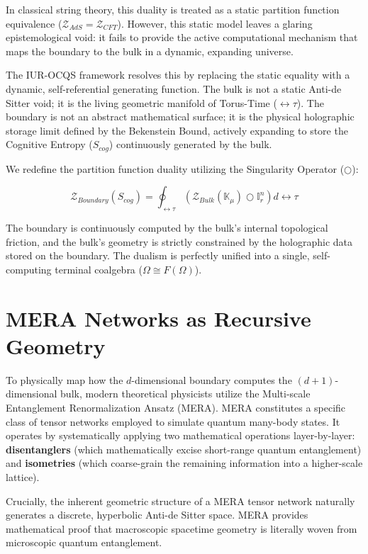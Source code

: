 \documentclass[12pt,openany]{book}
\begin{document}
In classical string theory, this duality is treated as a static partition function equivalence ($\mathcal{Z}_{AdS} = \mathcal{Z}_{CFT}$). However, this static model leaves a glaring epistemological void: it fails to provide the active computational mechanism that maps the boundary to the bulk in a dynamic, expanding universe. 

The IUR-OCQS framework resolves this by replacing the static equality with a dynamic, self-referential generating function. The bulk is not a static Anti-de Sitter void; it is the living geometric manifold of Torus-Time ($\leftrightarrow\tau$). The boundary is not an abstract mathematical surface; it is the physical holographic storage limit defined by the Bekenstein Bound, actively expanding to store the Cognitive Entropy ($S_{cog}$) continuously generated by the bulk. 

We redefine the partition function duality utilizing the Singularity Operator ($\bigcirc$):

\begin{equation}
\mathcal{Z}_{Boundary}(S_{cog}) = \oint_{\leftrightarrow\tau} \left( \mathcal{Z}_{Bulk}(\mathbb{K}_\mu) \bigcirc \mathbb{I}_r^n \right) d\leftrightarrow\tau
\end{equation}

The boundary is continuously computed by the bulk's internal topological friction, and the bulk's geometry is strictly constrained by the holographic data stored on the boundary. The dualism is perfectly unified into a single, self-computing terminal coalgebra ($\Omega \cong F(\Omega)$).

\section{MERA Networks as Recursive Geometry}
To physically map how the $d$-dimensional boundary computes the $(d+1)$-dimensional bulk, modern theoretical physicists utilize the Multi-scale Entanglement Renormalization Ansatz (MERA). MERA constitutes a specific class of tensor networks employed to simulate quantum many-body states. It operates by systematically applying two mathematical operations layer-by-layer: \textbf{disentanglers} (which mathematically excise short-range quantum entanglement) and \textbf{isometries} (which coarse-grain the remaining information into a higher-scale lattice).

Crucially, the inherent geometric structure of a MERA tensor network naturally generates a discrete, hyperbolic Anti-de Sitter space. MERA provides mathematical proof that macroscopic spacetime geometry is literally woven from microscopic quantum entanglement.
\end{document}
